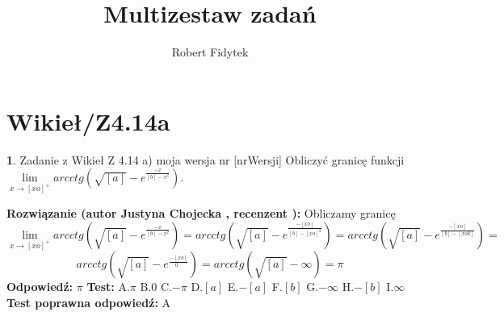 \documentclass[12pt, a4paper]{article}
\title{Multizestaw zadań}
\author{Robert Fidytek}
\date{}
\theoremstyle{definition} %
\newtheorem{zad}{}
\newcommand{\kategoria}[1]{\section{#1}} %
\newcommand{\zadStart}[1]{\begin{zad}#1\newline} %
\newcommand{\zadStop}{\end{zad}}   %
\newcommand{\rozwStart}[2]{\noindent \textbf{Rozwiązanie (autor #1 , recenzent #2): }\newline} %
\newcommand{\rozwStop}{\newline}                                            %
\newcommand{\odpStart}{\noindent \textbf{Odpowiedź:}\newline}    %
\newcommand{\odpStop}{\newline}                                             %
\newcommand{\testStart}{\noindent \textbf{Test:}\newline} %
\newcommand{\testStop}{\newline} %
\newcommand{\kluczStart}{\noindent \textbf{Test poprawna odpowiedź:}\newline} %
\newcommand{\kluczStop}{\newline} %
\begin{document}
\maketitle


\kategoria{Wikieł/Z4.14a}
\zadStart{Zadanie z Wikieł Z 4.14 a) moja wersja nr [nrWersji]}
Obliczyć granicę funkcji $\lim\limits_{x\to [xo]^{+}}arcctg\left(\sqrt{[a]}-e^{\frac{-x}{[b]-x^{2}}}\right)$. 
\zadStop
\rozwStart{Justyna Chojecka}{}
Obliczamy granicę
$$\lim\limits_{x\to [xo]^{+}}arcctg\left(\sqrt{[a]}-e^{\frac{-x}{[b]-x^{2}}}\right)=arcctg\left(\sqrt{[a]}-e^{\frac{-[xo]}{[b]-[xo]^{2}}}\right)=arcctg\left(\sqrt{[a]}-e^{\frac{-[xo]}{[b]-[xok]}}\right)=$$$$arcctg\left(\sqrt{[a]}-e^{\frac{-[xo]}{0^{-}}}\right)=arcctg\left(\sqrt{[a]}-\infty\right)=\pi$$
\rozwStop
\odpStart
$\pi$
\odpStop
\testStart
A.$\pi$
B.$0$
C.$-\pi$
D.$[a]$
E.$-[a]$
F.$[b]$
G.$-\infty$
H.$-[b]$
I.$\infty$
\testStop
\kluczStart
A
\kluczStop
\end{document}
